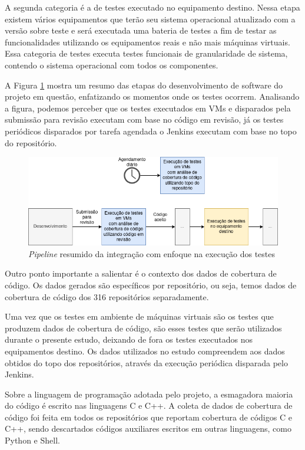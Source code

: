 \documentclass[11.5pt]{article}
\begin{document}
A segunda categoria é a de testes executado no equipamento destino.
Nessa etapa existem vários equipamentos que terão seu sistema operacional atualizado com a versão
sobre teste e será executada uma bateria de testes a fim de testar as funcionalidades utilizando
os equipamentos reais e não mais máquinas virtuais.
Essa categoria de testes executa testes funcionais de granularidade de sistema, contendo o sistema
operacional com todos os componentes.

A Figura \ref{fig:pipeline_tests} mostra um resumo das etapas do desenvolvimento de software do
projeto em questão, enfatizando os momentos onde os testes ocorrem.
Analisando a figura, podemos perceber que os testes executados em VMs e disparados pela submissão
para revisão executam com base no código em revisão, já os testes periódicos disparados por tarefa
agendada o Jenkins executam com base no topo do repositório.

\begin{figure}[ht]
    \centering
    \includegraphics[width=1.0\textwidth]{pipeline_tests.png}
    \caption{\textit{Pipeline} resumido da integração com enfoque na execução dos testes}
    \label{fig:pipeline_tests}
\end{figure}

Outro ponto importante a salientar é o contexto dos dados de cobertura de código.
Os dados gerados são específicos por repositório, ou seja, temos dados de cobertura de código dos
316 repositórios separadamente.

Uma vez que os testes em ambiente de máquinas virtuais são os testes que produzem dados de cobertura
de código, são esses testes que serão utilizados durante o presente estudo, deixando de fora os
testes executados nos equipamentos destino.
Os dados utilizados no estudo compreendem aos dados obtidos do topo dos repositórios, através da
execução periódica disparada pelo Jenkins.

Sobre a linguagem de programação adotada pelo projeto, a esmagadora maioria do código é escrito nas
linguagens C e C++.
A coleta de dados de cobertura de código foi feita em todos os repositórios que reportam cobertura
de códigos C e C++, sendo descartados códigos auxiliares escritos em outras linguagens, como Python
e Shell.
\end{document}
